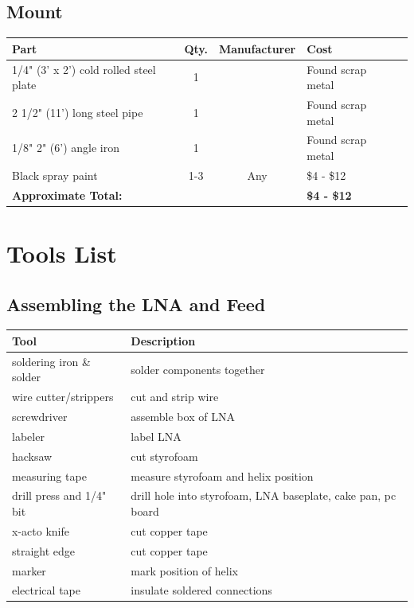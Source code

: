 \documentclass[11pt]{article} %
\begin{document}
\subsection{Mount}
\begin{tabular}{| p{6cm} | c | c | l | c |}
\hline
\textbf{Part} & \textbf{Qty.} & \textbf{Manufacturer} & \textbf{Cost} \\ \hline \hline
1/4" (3' x 2') cold rolled steel plate & 1 & & Found scrap metal \\ \hline	
2 1/2" (11') long steel pipe & 1 & &  Found scrap metal \\ \hline
1/8" 2" (6') angle iron	 & 1 & &  Found scrap metal \\ \hline
Black spray paint & 1-3 & Any & \$4 - \$12 \\ \hline
\textbf{Approximate Total:} & & & \textbf{\$4 - \$12} \\ \hline
\end{tabular}



\newpage
\section{Tools List}

\subsection{Assembling the LNA and Feed}
\begin{tabular}{| l | p{10cm} |}
\hline
\textbf{Tool} & \textbf{Description} \\ \hline \hline
soldering iron \& solder & solder components together \\ \hline
wire cutter/strippers & cut and strip wire\\ \hline
screwdriver & assemble box of LNA\\ \hline
labeler & label LNA\\ \hline
hacksaw & cut styrofoam\\ \hline
measuring tape & measure styrofoam and helix position\\ \hline
drill press and 1/4" bit & drill hole into styrofoam, LNA baseplate, cake pan, pc board\\ \hline
x-acto knife & cut copper tape\\ \hline
straight edge & cut copper tape\\ \hline
marker & mark position of helix\\ \hline
electrical tape & insulate soldered connections \\ \hline
\end{tabular}
\end{document}
